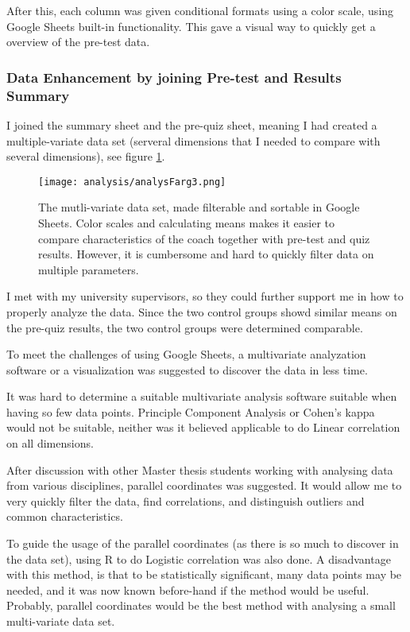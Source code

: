 After this, each column was given conditional formats using a color scale, using Google Sheets built-in functionality. This gave a visual way to quickly get a overview of the pre-test data.

\subsubsection{Data Enhancement by joining Pre-test and Results Summary}

I joined the summary sheet and the pre-quiz sheet, meaning I had created a multiple-variate data set (serveral dimensions that I needed to compare with several dimensions), see figure \ref{fig:analysFarg3}.

\begin{figure}[h]
    \centering
    \texttt{[image: analysis/analysFarg3.png]}
    \caption{The mutli-variate data set, made filterable and sortable in Google Sheets. Color scales and calculating means makes it easier to compare characteristics of the coach together with pre-test and quiz results. However, it is cumbersome and hard to quickly filter data on multiple parameters.}
    \label{fig:analysFarg3}
\end{figure}

I met with my university supervisors, so they could further support me in how to properly analyze the data. Since the two control groups showd similar means on the pre-quiz results, the two control groups were determined comparable.

To meet the challenges of using Google Sheets, a multivariate analyzation software or a visualization was suggested to discover the data in less time.

It was hard to determine a suitable multivariate analysis software suitable when having so few data points. Principle Component Analysis or Cohen's kappa would not be suitable, neither was it believed applicable to do Linear correlation on all dimensions.

After discussion with other Master thesis students working with analysing data from various disciplines, parallel coordinates was suggested. It would allow me to very quickly filter the data, find correlations, and distinguish outliers and common characteristics.

To guide the usage of the parallel coordinates (as there is so much to discover in the data set), using R to do Logistic correlation was also done. A disadvantage with this method, is that to be statistically significant, many data points may be needed, and it was now known before-hand if the method would be useful. Probably, parallel coordinates would be the best method with analysing a small multi-variate data set.

